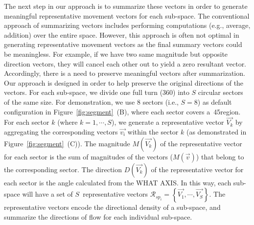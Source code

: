 
The next step in our approach is to summarize these vectors in order to generate meaningful representative movement vectors for each sub-space.
The conventional approach of summarizing vectors includes performing computations (e.g., average, addition) over the entire space. 
However, this approach is often not optimal in generating representative movement vectors as the final summary vectors could be meaningless.
For example, if we have two same magnitude but opposite direction vectors, they will cancel each other out to yield a zero resultant vector. 
Accordingly, there is a need to preserve meaningful vectors after summarization.
Our approach is designed in order to help preserve the original directions of the vectors. 
For each sub-space, we divide one full turn (360\degree) into $S$ circular sectors of the same size. %
For demonstration, we use 8 sectors (i.e., $S=8$) as default configuration in Figure~\ref{fig:segment}~(B), where each sector covers a~45\degree region. %
For each sector $k$ (where $k = 1,\cdots,S$), 
we generate a representative vector $\vec{V_k}$ by aggregating the corresponding vectors $\vec{v_i}$ within the sector $k$ (as demonstrated in Figure~\ref{fig:segment}~(C)).
The magnitude $M(\vec{V_k})$ of the representative vector for each sector is the sum of magnitudes of the vectors ($M(\vec{v})$) that belong to the corresponding sector.
The direction $D(\vec{V_k})$ of the representative vector for each sector is the angle calculated from the WHAT AXIS.
In this way, each sub-space will have a set of $S$~representative vectors $\mathcal{R}_{sp_i} = \left\{\vec{V_1}, \cdots, \vec{V_S}\right\}$. 
The representative vectors encode the directional density of a sub-space, and summarize the directions of flow for each individual sub-space.


